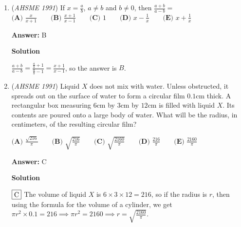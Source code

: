 \begin{enumerate}
 \textbf{Answer: }E



\textbf{Solution}

Recall that square roots are one-half powers, namely $\sqrt y=y^{\frac12}$ for all $y\geq0.$

 We have
 \begin{align*} \sqrt{x\sqrt{x\sqrt{x}}} &= \sqrt{x\sqrt{x\cdot x^{\frac12}}} \\ &= \sqrt{x\sqrt{x^{\frac32}}} \\ &= \sqrt{x\cdot\left(x^{\frac32}\right)^{\frac12}} \\ &= \sqrt{x^{\frac74}} \\ &= \left(x^{\frac74}\right)^{\frac12} \\ &= x^{\frac78} \\ &= \boxed{\textbf{(E) } \sqrt[8]{x^7}}. \end{align*}
~Hapaxoromenon (Solution)

 


	\item (\textit{AHSME 1991}) If $x=\frac{a}{b}$, $a\neq b$ and $b\neq 0$, then $\frac{a+b}{a-b}=$
$\textbf{(A) } \frac{x}{x+1} \qquad \textbf{(B) } \frac{x+1}{x-1} \qquad \textbf{(C) } 1 \qquad \textbf{(D) } x-\frac{1}{x} \qquad \textbf{(E) } x+\frac{1}{x}$

 \textbf{Answer: }B



\textbf{Solution}

$\frac{a+b}{a-b}= \frac{\frac{a}{b} + 1}{\frac{a}{b} - 1} = \frac{x+1}{x-1}$, so the answer is $\boxed{B}$.

 


	\item (\textit{AHSME 1991}) Liquid $X$ does not mix with water. Unless obstructed, it spreads out on the surface of water to form a circular film $0.1$cm thick. A rectangular box measuring $6$cm by $3$cm by $12$cm is filled with liquid $X$. Its contents are poured onto a large body of water. What will be the radius, in centimeters, of the resulting circular film?


 $\textbf{(A) } \frac{\sqrt{216}}{\pi} \qquad \textbf{(B) }\sqrt{\frac{216}{\pi}} \qquad \textbf{(C) } \sqrt{\frac{2160}{\pi}} \qquad \textbf{(D) } \frac{216}{\pi} \qquad \textbf{(E) } \frac{2160}{\pi}$

 \textbf{Answer: }C



\textbf{Solution}

$\fbox{C}$ The volume of liquid $X$ is $6 \times 3 \times 12 = 216$, so if the radius is $r$, then using the formula for the volume of a cylinder, we get $\pi r^2 \times 0.1 = 216 \implies \pi r^2 = 2160 \implies r = \sqrt{\frac{2160}{\pi}}.$




\end{enumerate}
